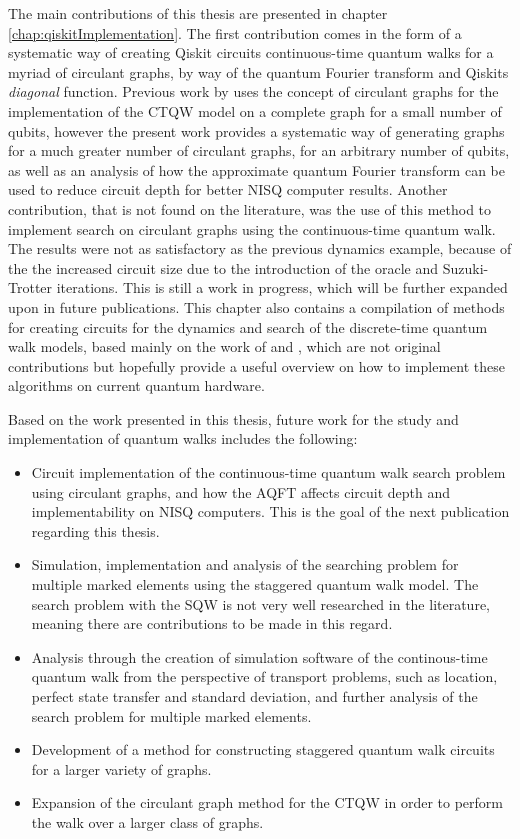 \documentclass[../../dissertation.tex]{subfiles}
\begin{document}
The main contributions of this thesis are presented in chapter
\ref{chap:qiskitImplementation}. The first contribution comes in the form
of a systematic way of creating Qiskit circuits continuous-time quantum walks
for a myriad of circulant graphs, by way of the quantum Fourier transform and
Qiskits \textit{diagonal} function. Previous work by \cite{qiang2016} uses
the concept of circulant graphs for the implementation of the CTQW model on a
complete graph for a small number of qubits, however the present work provides
a systematic way of generating graphs for a much greater number of circulant
graphs, for an arbitrary number of qubits, as well as an analysis of how the
approximate quantum Fourier transform can be used to reduce circuit depth for
better NISQ computer results. Another contribution, that is not found on the
literature, was the use of this method to implement search on circulant graphs
using the continuous-time quantum walk.  The results were not as satisfactory
as the previous dynamics example, because of the the increased circuit size due
to the introduction of the oracle and Suzuki-Trotter iterations. This is still
a work in progress, which will be further expanded upon in future publications.
This chapter also contains a compilation of methods for creating circuits for
the dynamics and search of the discrete-time quantum walk models, based mainly
on the work of \cite{douglaswang07} and \cite{acasiete2020}, which are not
original contributions but hopefully provide a useful overview on how to
implement these algorithms on current quantum hardware.\par

Based on the work presented in this thesis, future work for the study and
implementation of quantum walks includes the following:
\begin{itemize}
	\item Circuit implementation of the continuous-time quantum walk search problem using circulant graphs, and how the AQFT affects circuit depth and implementability on NISQ computers. This is the goal of the next publication regarding this thesis.
	\item Simulation, implementation and analysis of the searching problem for multiple marked elements using the staggered quantum walk model. The search problem with the SQW is not very well researched in the literature, meaning there are contributions to be made in this regard.
	\item Analysis through the creation of simulation software of the continous-time quantum walk from the perspective of transport problems, such as location, perfect state transfer and standard deviation, and further analysis of the search problem for multiple marked elements.
	\item Development of a method for constructing staggered quantum walk circuits for a larger variety of graphs.
	\item Expansion of the circulant graph method for the CTQW in order to perform the walk over a larger class of graphs.
\end{itemize}
\end{document}
